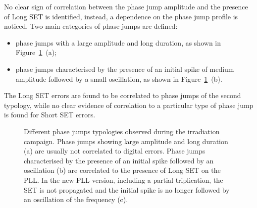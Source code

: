 No clear sign of correlation between the phase jump amplitude and the presence of Long SET is identified, instead, a dependence on the phase jump profile is noticed.
Two main categories of phase jumps are defined: 
\begin{itemize}
    \item [1.] phase jumps with a large amplitude and long duration, as shown in Figure~\ref{fig:SET_PhaseJump}~(a);
    \item [2.] phase jumps characterised by the presence of an initial spike of medium amplitude followed by a small oscillation, as shown in Figure~\ref{fig:SET_PhaseJump}~(b).
\end{itemize}
The Long SET errors are found to be correlated to phase jumps of the second typology, while no clear evidence of correlation to a particular type of phase jump is found for Short SET errors.

\begin{figure}
    \centering
    \caption{Different phase jumps typologies observed during the irradiation campaign. Phase jumps showing large amplitude and long duration (a) are usually not correlated to digital errors. Phase jumps characterised by the presence of an initial spike followed by an oscillation (b) are correlated to the presence of Long SET on the PLL. In the new PLL version, including a partial triplication, the SET is not propagated and the initial spike is no longer followed by an oscillation of the frequency (c).}
    \label{fig:SET_PhaseJump}
\end{figure}

